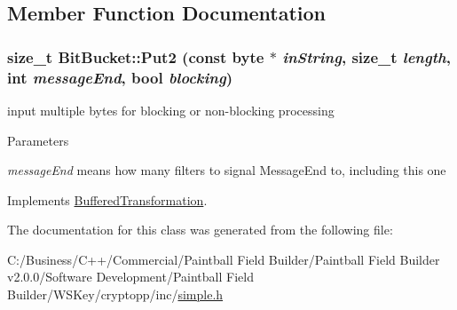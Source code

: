 \subsection{Member Function Documentation}
\hypertarget{class_bit_bucket_a943abc22eb4b838010fd58e50fab425a}{
\subsubsection[{Put2}]{\setlength{\rightskip}{0pt plus 5cm}size\_\-t BitBucket::Put2 (const byte $\ast$ {\em inString}, \/  size\_\-t {\em length}, \/  int {\em messageEnd}, \/  bool {\em blocking})}}
\label{class_bit_bucket_a943abc22eb4b838010fd58e50fab425a}


input multiple bytes for blocking or non-\/blocking processing 
\begin{DoxyParams}{Parameters}
\item[{\em messageEnd}]means how many filters to signal MessageEnd to, including this one \end{DoxyParams}


Implements \hyperlink{class_buffered_transformation_ad396dcb42260f23125a35ec0e5d17d55}{BufferedTransformation}.

The documentation for this class was generated from the following file:\begin{DoxyCompactItemize}
\item 
C:/Business/C++/Commercial/Paintball Field Builder/Paintball Field Builder v2.0.0/Software Development/Paintball Field Builder/WSKey/cryptopp/inc/\hyperlink{simple_8h}{simple.h}\end{DoxyCompactItemize}
